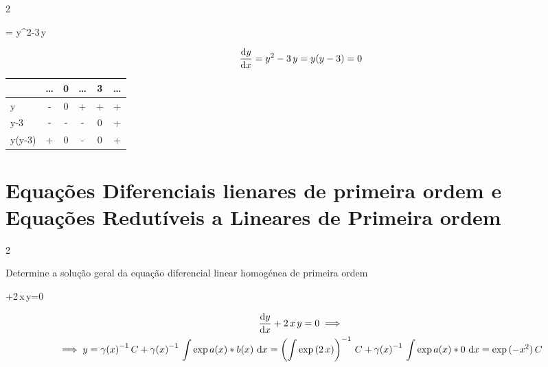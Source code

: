 \documentclass["./AM3C.exercises_resolutions.2024.tex"]{subfiles}
\begin{document}
\begin{questionBox}2{} %

  \begin{BM}
    = y^2-3\,y
  \end{BM}

  \answer{}

  \begin{gather*}
    \odv{y}{x}
    = y^2-3\,y
    = y(y-3)
    = 0
  \end{gather*}
  \begin{center}
    \vspace{1ex}
    \begin{tabular}{L *5{C}}
      \toprule

      & \dots & 0 & \dots & 3 & \dots
      \\\midrule

      y
      & -     & 0 & +     & + & +
      \\ y-3
      & -     & - & -     & 0 & +
      \\\midrule
      y(y-3)
      & +     & 0 & -     & 0 & +

      \\\bottomrule
    \end{tabular}
    \vspace{2ex}
  \end{center}

\end{questionBox}

\part*{Equações Diferenciais lienares de primeira ordem e Equações Redutíveis a Lineares de Primeira ordem}

\setcounter{question}{5}
\begin{questionBox}2{} %

  Determine a solução geral da equação diferencial linear homogénea de primeira ordem
  \begin{BM}
    +2\,x\,y=0
  \end{BM}

  \answer{}

  \begin{gather*}
    \odv{y}{x}+2\,x\,y=0
    \implies \\
    \implies
    y
    = \gamma{(x)}^{-1}
    \,C
    + \gamma{(x)}^{-1}
    \,\int{\exp{a(x)}*b(x)\,\odif{x}}
    = \left(
      \int{\exp{(2\,x)}}
    \right)^{-1}
    \,C
    + \gamma{(x)}^{-1}
    \,\int{\exp{a(x)}*0\,\odif{x}}
    = \exp{(-x^2)}
    \,C
  \end{gather*}
\end{questionBox}
\end{document}
